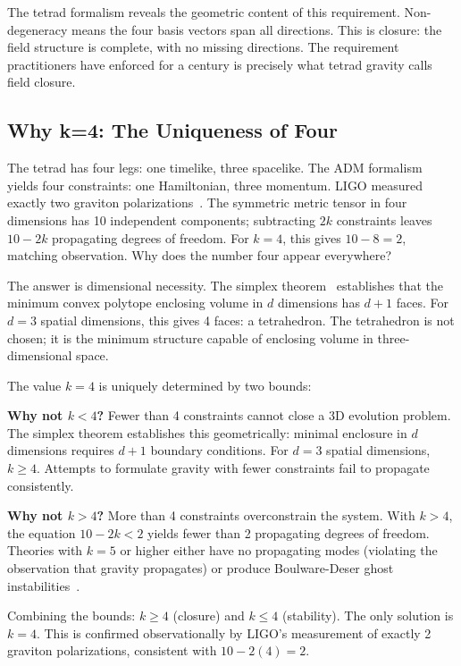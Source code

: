 \documentclass[aps,prd,preprint,superscriptaddress,showpacs,preprintnumbers,amsmath,amssymb,nofootinbib]{revtex4-2}
\begin{document}
The tetrad formalism reveals the geometric content of this requirement. Non-degeneracy means the four basis vectors span all directions. This is closure: the field structure is complete, with no missing directions. The requirement practitioners have enforced for a century is precisely what tetrad gravity calls field closure.

\subsection{Why k=4: The Uniqueness of Four}
\label{subsec:k4}

The tetrad has four legs: one timelike, three spacelike. The ADM formalism~\cite{adm1962} yields four constraints: one Hamiltonian, three momentum. LIGO measured exactly two graviton polarizations~\cite{gw170817}. The symmetric metric tensor in four dimensions has 10 independent components; subtracting $2k$ constraints leaves $10 - 2k$ propagating degrees of freedom. For $k = 4$, this gives $10 - 8 = 2$, matching observation. Why does the number four appear everywhere?

The answer is dimensional necessity. The simplex theorem~\cite{ziegler1995} establishes that the minimum convex polytope enclosing volume in $d$ dimensions has $d+1$ faces. For $d = 3$ spatial dimensions, this gives 4 faces: a tetrahedron. The tetrahedron is not chosen; it is the minimum structure capable of enclosing volume in three-dimensional space.

The value $k = 4$ is uniquely determined by two bounds:

\textbf{Why not $k < 4$?} Fewer than 4 constraints cannot close a 3D evolution problem. The simplex theorem establishes this geometrically: minimal enclosure in $d$ dimensions requires $d+1$ boundary conditions. For $d = 3$ spatial dimensions, $k \geq 4$. Attempts to formulate gravity with fewer constraints fail to propagate consistently.

\textbf{Why not $k > 4$?} More than 4 constraints overconstrain the system. With $k > 4$, the equation $10 - 2k < 2$ yields fewer than 2 propagating degrees of freedom. Theories with $k = 5$ or higher either have no propagating modes (violating the observation that gravity propagates) or produce Boulware-Deser ghost instabilities~\cite{boulware1972}.

Combining the bounds: $k \geq 4$ (closure) and $k \leq 4$ (stability). The only solution is $k = 4$. This is confirmed observationally by LIGO's measurement of exactly 2 graviton polarizations, consistent with $10 - 2(4) = 2$.
\end{document}
